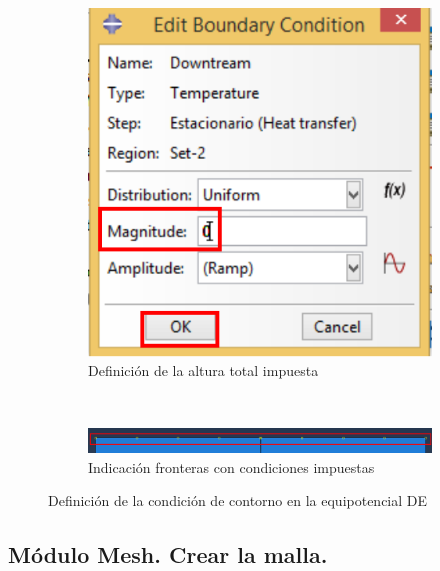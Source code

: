 \begin{figure}[!h]
    \begin{subfigure}[!h]{0.42\textwidth}
      \includegraphics[width=\textwidth]{./body/images/load08.pdf}
      \caption{Definición de la altura total impuesta}
      \label{load08}
    \end{subfigure}%
    ~ %
    \begin{subfigure}[!h]{0.55\textwidth}
      \includegraphics[width=\textwidth]{./body/images/load09.pdf}
      \caption{Indicación fronteras con condiciones impuestas}
      \label{load09}
    \end{subfigure}%
    \caption{Definición de la condición de contorno en la
      equipotencial DE}
  \end{figure}


  \subsection{Módulo Mesh. Crear la malla.}

